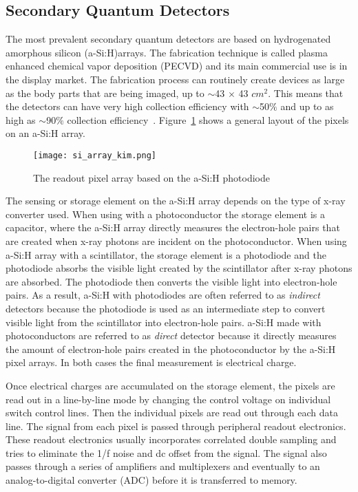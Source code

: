 \subsection{Secondary Quantum Detectors}
The most prevalent secondary quantum detectors are based on hydrogenated amorphous silicon (a-Si:H)arrays.  The fabrication technique is called plasma enhanced chemical vapor deposition (PECVD) and its main commercial use is in the display market.  The fabrication process can routinely create devices as large as the body parts that are being imaged, up to $\sim$43 $\times$ 43 $cm^2$.  This means that the detectors can have very high collection efficiency with $\sim$50$\%$ and up to as high as $\sim$90$\%$ collection efficiency~\citep{Yorkston2007}.
Figure~\ref{fig:a-Si:H array} shows a general layout of the pixels on an a-Si:H array.  

\begin{figure}[ht]
\texttt{[image: si\_array\_kim.png]}
\caption{The readout pixel array based on the a-Si:H photodiode~\citep{Kim2008}}
\label{fig:a-Si:H array}
\end{figure}

The sensing or storage element on the a-Si:H array depends on the type of x-ray converter used.  When using with a photoconductor the storage element is a capacitor, where the a-Si:H array directly measures the electron-hole pairs that are created when x-ray photons are incident on the photoconductor.  When using a-Si:H array with a scintillator, the storage element is a photodiode and the photodiode absorbs the visible light created by the scintillator after x-ray photons are absorbed. The photodiode then converts the visible light into electron-hole pairs.  As a result, a-Si:H with photodiodes are often referred to as \textit{indirect} detectors because the photodiode is used as an intermediate step to convert visible light from the scintillator into electron-hole pairs.  a-Si:H made with photoconductors are referred to as \textit{direct} detector because it directly measures the amount of electron-hole pairs created in the photoconductor by the a-Si:H pixel arrays.  In both cases the final measurement is electrical charge.  

Once electrical charges are accumulated on the storage element, the pixels are read out in a line-by-line mode by changing the control voltage on individual switch control lines.  Then the individual pixels are read out through each data line.  The signal from each pixel is passed through peripheral readout electronics.  These readout electronics usually incorporates correlated double sampling and tries to eliminate the 1/f noise and dc offset from the signal.  The signal also passes through a series of amplifiers and multiplexers and eventually to an analog-to-digital converter (ADC) before it is transferred to memory.  

